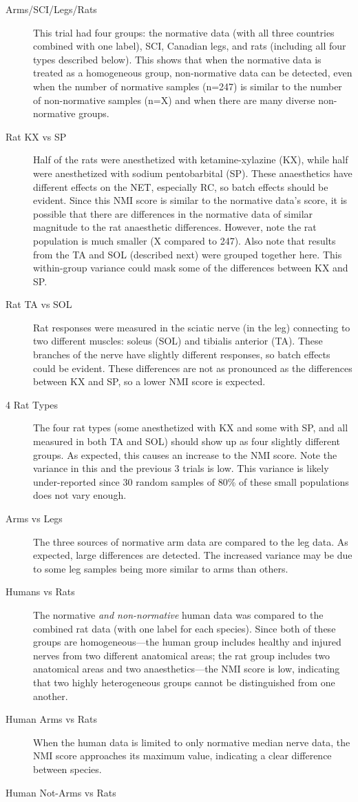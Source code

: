 \documentclass[12pt]{article}
\begin{document}
\begin{description}
\item [Arms/SCI/Legs/Rats] This trial had four groups: the normative data (with all three countries combined with one label), SCI, Canadian legs, and rats (including all four types described below). This shows that when the normative data is treated as a homogeneous group, non-normative data can be detected, even when the number of normative samples (n=247) is similar to the number of non-normative samples (n=X) and when there are many diverse non-normative groups.
\item [Rat KX vs SP] Half of the rats were anesthetized with ketamine-xylazine (KX), while half were anesthetized with sodium pentobarbital (SP). These anaesthetics have different effects on the NET, especially RC, so batch effects should be evident. Since this NMI score is similar to the normative data's score, it is possible that there are differences in the normative data of similar magnitude to the rat anaesthetic differences. However, note the rat population is much smaller (X compared to 247). Also note that results from the TA and SOL (described next) were grouped together here. This within-group variance could mask some of the differences between KX and SP.
\item [Rat TA vs SOL] Rat responses were measured in the sciatic nerve (in the leg) connecting to two different muscles: soleus (SOL) and tibialis anterior (TA). These branches of the nerve have slightly different responses, so batch effects could be evident. These differences are not as pronounced as the differences between KX and SP, so a lower NMI score is expected.
\item [4 Rat Types] The four rat types (some anesthetized with KX and some with SP, and all measured in both TA and SOL) should show up as four slightly different groups. As expected, this causes an increase to the NMI score. Note the variance in this and the previous 3 trials is low. This variance is likely under-reported since 30 random samples of 80\% of these small populations does not vary enough.
\item [Arms vs Legs] The three sources of normative arm data are compared to the leg data. As expected, large differences are detected. The increased variance may be due to some leg samples being more similar to arms than others.
\item [Humans vs Rats] The normative \emph{and non-normative} human data was compared to the combined rat data (with one label for each species). Since both of these groups are homogeneous—the human group includes healthy and injured nerves from two different anatomical areas; the rat group includes two anatomical areas and two anaesthetics—the NMI score is low, indicating that two highly heterogeneous groups cannot be distinguished from one another.
\item [Human Arms vs Rats] When the human data is limited to only normative median nerve data, the NMI score approaches its maximum value, indicating a clear difference between species.
\item [Human Not-Arms vs Rats] %
\end{description}
\end{document}
